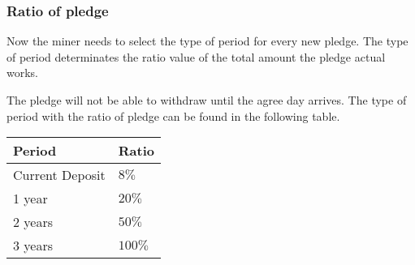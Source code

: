 \subsubsection{Ratio of pledge}
\begin{flushleft}
    Now the miner needs to select the type of period for every new pledge. The type of period determinates the ratio value of the total amount the pledge actual works.
\end{flushleft}
\begin{flushleft}
    The pledge will not be able to withdraw until the agree day arrives. The type of period with the ratio of pledge can be found in the following table.
\end{flushleft}
\begin{tabular}{ |p{5cm}|p{3cm}| }
    \hline
    \textbf{Period} & \textbf{Ratio} \\[5pt]
    \hline
    \rowcolor{lightgray!30} Current Deposit & $8\%$ \\[5pt]
    1 year & $20\%$ \\[5pt]
    \rowcolor{lightgray!30} 2 years & $50\%$ \\[5pt]
    3 years & $100\%$ \\[5pt]
    \hline
\end{tabular}
